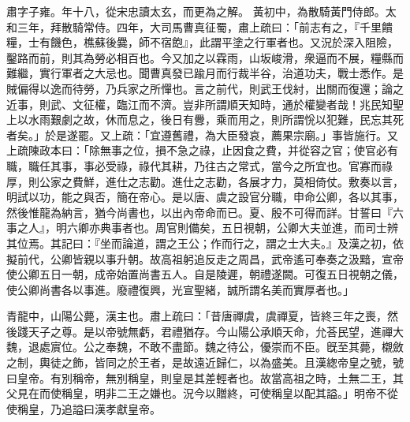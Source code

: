 \begin{pinyinscope}
肅字子雍。年十八，從宋忠讀太玄，而更為之解。
黃初中，為散騎黃門侍郎。太和三年，拜散騎常侍。四年，大司馬曹真征蜀，肅上疏曰：「前志有之，『千里饋糧，士有饑色，樵蘇後爨，師不宿飽』，此謂平塗之行軍者也。又況於深入阻險，鑿路而前，則其為勞必相百也。今又加之以霖雨，山坂峻滑，衆逼而不展，糧縣而難繼，實行軍者之大忌也。聞曹真發已踰月而行裁半谷，治道功夫，戰士悉作。是賊偏得以逸而待勞，乃兵家之所憚也。言之前代，則武王伐紂，出關而復還；論之近事，則武、文征權，臨江而不濟。豈非所謂順天知時，通於權變者哉！兆民知聖上以水雨艱劇之故，休而息之，後日有釁，乘而用之，則所謂恱以犯難，民忘其死者矣。」於是遂罷。又上疏：「宜遵舊禮，為大臣發哀，薦果宗廟。」事皆施行。又上疏陳政本曰：「除無事之位，損不急之祿，止因食之費，并從容之官；使官必有職，職任其事，事必受祿，祿代其耕，乃往古之常式，當今之所宜也。官寡而祿厚，則公家之費鮮，進仕之志勸。進仕之志勸，各展才力，莫相倚仗。敷奏以言，明試以功，能之與否，簡在帝心。是以唐、虞之設官分職，申命公卿，各以其事，然後惟龍為納言，猶今尚書也，以出內帝命而已。夏、殷不可得而詳。甘誓曰『六事之人』，明六卿亦典事者也。周官則備矣，五日視朝，公卿大夫並進，而司士辨其位焉。其記曰：『坐而論道，謂之王公；作而行之，謂之士大夫。』及漢之初，依擬前代，公卿皆親以事升朝。故高祖躬追反走之周昌，武帝遙可奉奏之汲黯，宣帝使公卿五日一朝，成帝始置尚書五人。自是陵遲，朝禮遂闕。可復五日視朝之儀，使公卿尚書各以事進。廢禮復興，光宣聖緒，誠所謂名美而實厚者也。」


青龍中，山陽公薨，漢主也。肅上疏曰：「昔唐禪虞，虞禪夏，皆終三年之喪，然後踐天子之尊。是以帝號無虧，君禮猶存。今山陽公承順天命，允荅民望，進禪大魏，退處賔位。公之奉魏，不敢不盡節。魏之待公，優崇而不臣。旣至其薨，櫬斂之制，輿徒之飾，皆同之於王者，是故遠近歸仁，以為盛美。且漢緫帝皇之號，號曰皇帝。有別稱帝，無別稱皇，則皇是其差輕者也。故當高祖之時，土無二王，其父見在而使稱皇，明非二王之嫌也。況今以贈終，可使稱皇以配其謚。」明帝不從使稱皇，乃追謚曰漢孝獻皇帝。





\end{pinyinscope}
